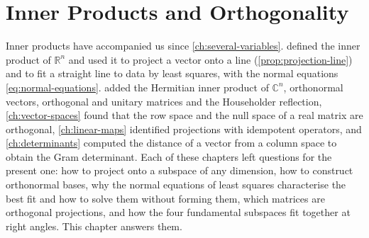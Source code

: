 \chapter{Inner Products and Orthogonality}
\label{ch:inner-products}


Inner products have accompanied us since \cref{ch:several-variables}.  defined the inner product of $\mathbb R^n$ and used it to project a vector onto a line (\cref{prop:projection-line}) and to fit a straight line to data by least squares, with the normal equations \eqref{eq:normal-equations}.  added the Hermitian inner product of $\mathbb C^n$, orthonormal vectors, orthogonal and unitary matrices and the Householder reflection, \cref{ch:vector-spaces} found that the row space and the null space of a real matrix are orthogonal, \cref{ch:linear-maps} identified projections with idempotent operators, and \cref{ch:determinants} computed the distance of a vector from a column space to obtain the Gram determinant. Each of these chapters left questions for the present one: how to project onto a subspace of any dimension, how to construct orthonormal bases, why the normal equations of least squares characterise the best fit and how to solve them without forming them, which matrices are orthogonal projections, and how the four fundamental subspaces fit together at right angles. This chapter answers them.


